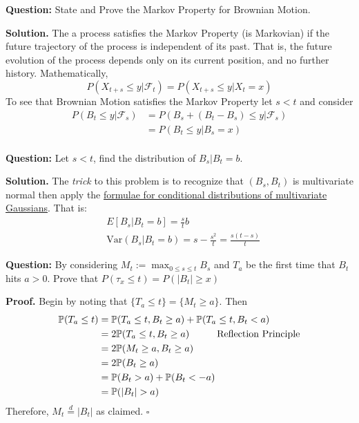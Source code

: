 \documentclass{article}
\begin{document}
\begin{tcolorbox}[colframe=black,colback=gray!5,boxrule=0.5pt]
\textbf{Question:} State and Prove the Markov Property for Brownian Motion.
\end{tcolorbox}
\textbf{Solution.} The a process satisfies the Markov Property (is Markovian) if the future trajectory of the process is independent of its past. That is, the future evolution of the process depends only on its current position, and no further history. Mathematically, 
$$P(X_{t+s} \leq y| \mathcal{F}_t) = P(X_{t+s} \leq y| X_t=x)$$
To see that Brownian Motion satisfies the Markov Property let $s <t$ and consider 
\begin{align*}
    P(B_t \leq y| \mathcal{F}_s) &= P(B_s + (B_t-B_s) \leq y|\mathcal{F}_s) \\
    &= P(B_t \leq y| B_s =x) \\
\end{align*}

\begin{tcolorbox}[colframe=black,colback=gray!5,boxrule=0.5pt]
\textbf{Question:} Let $s < t$, find the distribution of $B_s | B_t = b$.
\end{tcolorbox}
\textbf{Solution.} The \textit{trick} to this problem is to recognize that $(B_s, B_t)$ is multivariate normal then apply the \href{https://online.stat.psu.edu/stat505/lesson/6/6.1}{formulae for conditional distributions of multivariate Gaussians}. That is: 
\begin{align*}
    & E[B_s | B_t=b] = \frac{s}{t}b \\
    &\text{Var}(B_s | B_t=b) = s-\frac{s^2}{t} = \frac{s(t-s)}{t}
\end{align*}


\begin{tcolorbox}[colframe=black,colback=gray!5,boxrule=0.5pt]
\textbf{Question:} By considering $M_t := \max_{0\leq s \leq t} B_s$ and $T_a$ be the first time that $B_t$ hits $a > 0$. Prove that $P(\tau_x\leq t) = P(|B_t|\geq x)$  
\end{tcolorbox}
\textbf{Proof.} Begin by noting that $\{T_a\leq t\} = \{M_t\geq a\}$. Then
\begin{align*}
    \mathbb{P}(T_a\leq t) &= \mathbb{P}(T_a\leq t, B_t\geq a) + \mathbb{P}(T_a\leq t, B_t< a) \\
    &= 2\mathbb{P}(T_a\leq t, B_t\geq a) \hspace{10mm} \text{Reflection Principle} \\
    &= 2\mathbb{P}(M_t\geq a, B_t\geq a) \\
    &= 2\mathbb{P}(B_t\geq a) \\
    &= \mathbb{P}(B_t> a) + \mathbb{P}(B_t <-a) \\
    &= \mathbb{P}(|B_t| > a)
\end{align*}
Therefore, $M_t \stackrel{d}{=} |B_t|$ as claimed. $\square$
\end{document}

